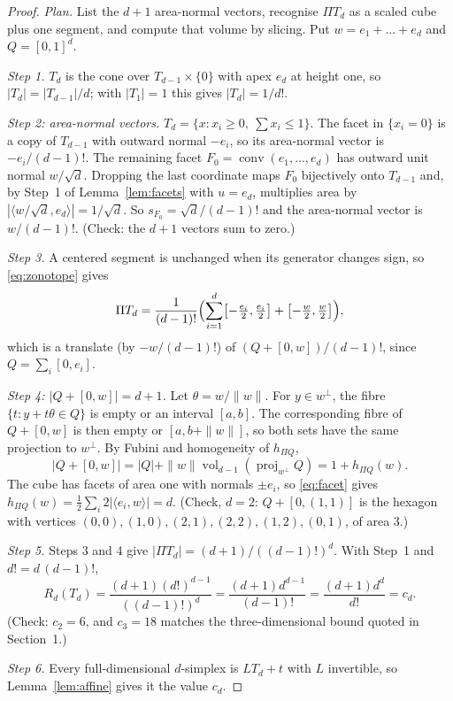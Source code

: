 \documentclass[11pt]{article}
\DeclareMathOperator{\conv}{conv}
\DeclareMathOperator{\vol}{vol}
\DeclareMathOperator{\proj}{proj}
\begin{document}
\begin{proof}
\emph{Plan.} List the \(d+1\) area-normal vectors, recognise \(\Pi T_d\) as a scaled cube plus one segment, and compute that volume by slicing. Put \(w=e_1+\dots+e_d\) and \(Q=[0,1]^d\).

\emph{Step 1.} \(T_d\) is the cone over \(T_{d-1}\times\{0\}\) with apex \(e_d\) at height one, so \(|T_d|=|T_{d-1}|/d\); with \(|T_1|=1\) this gives \(|T_d|=1/d!\).

\emph{Step 2: area-normal vectors.} \(T_d=\{x:x_i\ge0,\ \sum x_i\le1\}\). The facet in \(\{x_i=0\}\) is a copy of \(T_{d-1}\) with outward normal \(-e_i\), so its area-normal vector is \(-e_i/(d-1)!\). The remaining facet \(F_0=\conv(e_1,\dots,e_d)\) has outward unit normal \(w/\sqrt d\). Dropping the last coordinate maps \(F_0\) bijectively onto \(T_{d-1}\) and, by Step~1 of Lemma~\ref{lem:facets} with \(u=e_d\), multiplies area by \(|\langle w/\sqrt d,e_d\rangle|=1/\sqrt d\). So \(s_{F_0}=\sqrt d/(d-1)!\) and the area-normal vector is \(w/(d-1)!\). (Check: the \(d+1\) vectors sum to zero.)

\emph{Step 3.} A centered segment is unchanged when its generator changes sign, so \eqref{eq:zonotope} gives
\[
 \Pi T_d=\frac1{(d-1)!}\Bigl(\sum_{i=1}^d\bigl[-\tfrac{e_i}2,\tfrac{e_i}2\bigr]+\bigl[-\tfrac w2,\tfrac w2\bigr]\Bigr),
\]
which is a translate (by \(-w/(d-1)!\)) of \((Q+[0,w])/(d-1)!\), since \(Q=\sum_i[0,e_i]\).

\emph{Step 4: \(|Q+[0,w]|=d+1\).} Let \(\theta=w/\|w\|\). For \(y\in w^\perp\), the fibre \(\{t:y+t\theta\in Q\}\) is empty or an interval \([a,b]\). The corresponding fibre of \(Q+[0,w]\) is then empty or \([a,b+\|w\|]\), so both sets have the same projection to \(w^\perp\). By Fubini and homogeneity of \(h_{\Pi Q}\),
\[
 |Q+[0,w]|
 =|Q|+\|w\|\vol_{d-1}(\proj_{w^\perp}Q)
 =1+h_{\Pi Q}(w).
\]
The cube has facets of area one with normals \(\pm e_i\), so \eqref{eq:facet} gives \(h_{\Pi Q}(w)=\frac12\sum_{i}2|\langle e_i,w\rangle|=d\). (Check, \(d=2\): \(Q+[0,(1,1)]\) is the hexagon with vertices \((0,0),(1,0),(2,1),(2,2),(1,2),(0,1)\), of area \(3\).)

\emph{Step 5.} Steps 3 and 4 give \(|\Pi T_d|=(d+1)/((d-1)!)^d\). With Step~1 and \(d!=d\,(d-1)!\),
\[
 R_d(T_d)=\frac{(d+1)(d!)^{d-1}}{((d-1)!)^d}
 =\frac{(d+1)d^{d-1}}{(d-1)!}
 =\frac{(d+1)d^d}{d!}=c_d .
\]
(Check: \(c_2=6\), and \(c_3=18\) matches the three-dimensional bound quoted in Section~1.)

\emph{Step 6.} Every full-dimensional \(d\)-simplex is \(LT_d+t\) with \(L\) invertible, so Lemma~\ref{lem:affine} gives it the value \(c_d\).
\end{proof}
\end{document}
